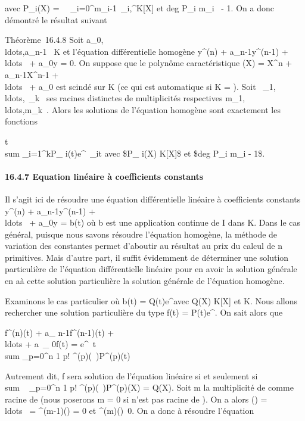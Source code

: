 \documentclass[]{article}
\begin{document}
avec P\_i(X) =\
\sum ~
\_i=0^m\_i-1\alpha~\_i,\jmathX^\jmath \in K{[}X{]}
et deg P\_i \leq m\_i~ - 1. On a
donc démontré le résultat suivant

Théorème~16.4.8 Soit
a\_0,\\ldots,a\_n-1~
\in K et l'équation différentielle homogène y^(n) +
a\_n-1y^(n-1) +
\\ldots~ +
a\_0y = 0. On suppose que le polynôme caractéristique \chi(X) =
X^n + a\_n-1X^n-1 +
\\ldots~ +
a\_0 est scindé sur K (ce qui est automatique si K = ). Soit
\lambda~\_1,\\ldots,\lambda~\_k~
ses racines distinctes de multiplicités respectives
m\_1,\\ldots,m\_k~.
Alors les solutions de l'équation homogène sont exactement les fonctions

t\mapsto~\\sum
\_i=1^kP\_
i(t)e^\lambda~\_it\quad
\text avec \$P\_ i(X) \in K{[}X{]}\$ et \$deg
P\_i \leq m\_i - 1\$.

\paragraph{16.4.7 Equation linéaire à coefficients constants}

Il s'agit ici de résoudre une équation différentielle linéaire à
coefficients constants y^(n) +
a\_n-1y^(n-1) +
\\ldots~ +
a\_0y = b(t) où b est une application continue de I dans K. Dans
le cas général, puisque nous savons résoudre l'équation homogène, la
méthode de variation des constantes permet d'aboutir au résultat au prix
du calcul de n primitives. Mais d'autre part, il suffit évidemment de
déterminer une solution particulière de l'équation différentielle
linéaire pour en avoir la solution générale en a\jmathoutant à cette solution
particulière la solution générale de l'équation homogène.

Examinons le cas particulier où b(t) = Q(t)e^\mut avec Q(X) \in
K{[}X{]} et \mu \in K. Nous allons rechercher une solution particulière du
type f(t) = P(t)e^\mut. On sait alors que

f^(n)(t) + a\_ n-1f^(n-1)(t) +
\\ldots + a~\_
0f(t) = e^\lambda~t \\sum
\_p=0^n 1 \over p!
\chi^(p)(\lambda~)P^(p)(t)

Autrement dit, f sera solution de l'équation linéaire si et seulement
si~\\sum ~
\_p=0^n 1 \over p!
\chi^(p)(\lambda~)P^(p)(X) = Q(X). Soit m la multiplicité de
\mu comme racine de \chi (nous poserons m = 0 si \mu n'est pas racine de \chi). On
a alors \chi(\mu) =
\\ldots~ =
\chi^(m-1)(\mu) = 0 et
\chi^(m)(\mu)\neq~0. On a donc à résoudre
l'équation
\end{document}
